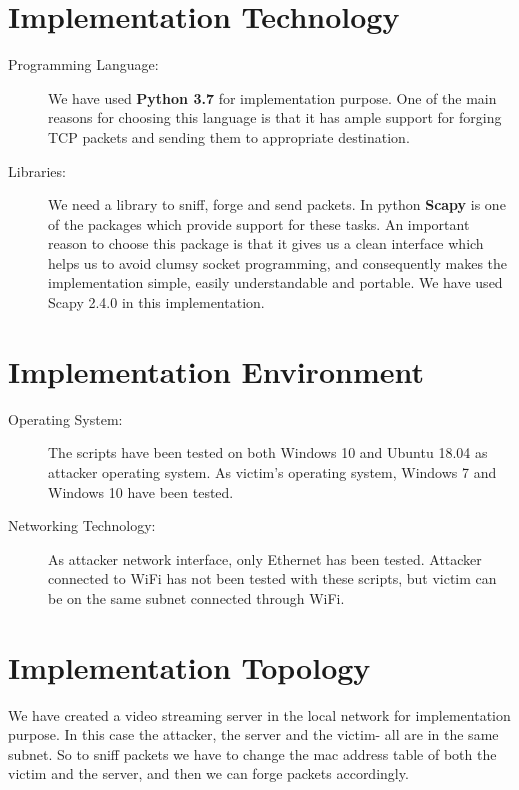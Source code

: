 \documentclass[14pt]{extarticle}
\begin{document}
\section{Implementation Technology}
    \begin{description}
        \item[Programming Language:] We have used \textbf{Python 3.7} for implementation purpose. One of the main reasons for choosing this language is that it has ample support for forging TCP packets and sending them to appropriate destination. 
        
        \item[Libraries:] We need a library to sniff, forge and send packets. In python \textbf{Scapy} is one of the packages which provide support for these tasks. An important reason to choose this package is that it gives us a clean interface which helps us to avoid clumsy socket programming, and consequently makes the implementation simple, easily understandable and portable. We have used Scapy 2.4.0 in this implementation. 
    
    \end{description}
    
    
\section{Implementation Environment}
   \begin{description}
        \item[Operating System:] The scripts have been tested on both Windows 10 and Ubuntu 18.04 as attacker operating system. As victim's operating system, Windows 7 and Windows 10 have been tested.
        
        \item[Networking Technology:] As attacker network interface, only Ethernet has been tested. Attacker connected to WiFi has not been tested with these scripts, but victim can be on the same subnet connected through WiFi.
    
    \end{description}

\section{Implementation Topology}
    \label{sec:implement_topology}
    
    
    We have created a video streaming server in the local network for implementation purpose. In this case the attacker, the server and the victim- all are in the same subnet. So to sniff packets we have to change the mac address table of both the victim and the server, and then we can forge packets accordingly.
    
\end{document}
